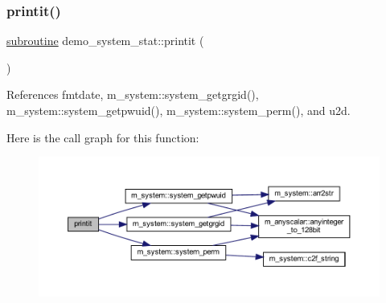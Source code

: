 \subsubsection{\texorpdfstring{printit()}{printit()}}
{\footnotesize\ttfamily \hyperlink{M__stopwatch_83_8txt_acfbcff50169d691ff02d4a123ed70482}{subroutine} demo\+\_\+system\+\_\+stat\+::printit (\begin{DoxyParamCaption}{ }\end{DoxyParamCaption})}



References fmtdate, m\+\_\+system\+::system\+\_\+getgrgid(), m\+\_\+system\+::system\+\_\+getpwuid(), m\+\_\+system\+::system\+\_\+perm(), and u2d.

Here is the call graph for this function\+:
\nopagebreak
\begin{figure}[H]
\begin{center}
\leavevmode
\includegraphics[width=350pt]{__stat_8f90_a9ea6ab9cdaa05a5fc3ac6e5448b11c68_cgraph}
\end{center}
\end{figure}
